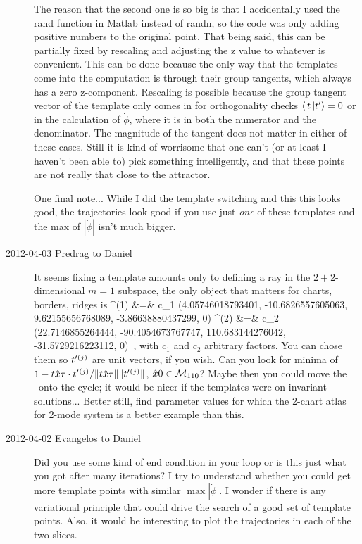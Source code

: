 \begin{description}
The reason that the second one is so big is that I accidentally used the
rand function in Matlab instead of randn, so the code was only adding
positive numbers to the original point. That being said, this can be
partially fixed by rescaling and adjusting the z value to whatever is
convenient. This can be done because the only way that the templates come
into the computation is through their group tangents, which always has a
zero z-component. Rescaling is possible because the group tangent vector
of the template only comes in for orthogonality checks
$\braket{\,t\,}{\sliceTan{}{}} = 0$ or in the calculation of
$\dot{\phi}$, where it is in both the numerator and the denominator. The
magnitude of the tangent does not matter in either of these cases. Still
it is kind of worrisome that one can't (or at least I haven't been able
to) pick something intelligently, and that these points are not really
that close to the attractor.

One final note... While I did the template switching and this this looks
good, the trajectories look good if you use just \emph{one} of these
templates and the max of $|\dot{\phi}|$ isn't much bigger.

\item[2012-04-03 Predrag to Daniel] It seems fixing a template amounts only to defining a ray in the
$2 + 2$-dimensional $m=1$ subspace, the only object that matters for charts, borders, ridges is
\bea
\sliceTan{}{}^{(1)} &=& c_1 (4.05746018793401, -10.6826557605063,  9.62155656768089, -3.86638880437299, 0)
    \continue
\sliceTan{}{}^{(2)} &=& c_2 (22.7146855264444, -90.4054673767747, 110.683144276042, -31.5729216223112, 0)
\,,
\label{DanielTmpls}
\eea
with $c_1$ and $c_2$ arbitrary factors. You can chose them so
$t'_{}{}^{(j)}$ are unit vectors, if you wish. Can you look for
minima of
$1-t{\hat{x}{\tau}} \cdot t'_{}{}^{(j)}
   / \|{t{\hat{x}{\tau}}}\| \|{t'_{}{}^{(j)}}\|$, $\hat{x}{0} \in {\cal M}_{110}$?
Maybe then you could move the \template\ onto the cycle; it would be
nicer if the templates were on invariant solutions... Better still, find
parameter values for which the 2-chart atlas for 2-mode system is a
better example than this.

\item[2012-04-02 Evangelos to Daniel] Did you use some kind of end condition in
your loop or is this just what you got after many iterations? I try to understand
whether you could get more template points with similar $\max |\dot{\phi}|$.
I wonder if there is any variational principle that could drive the search of
a good set of template points.
Also, it would be interesting to plot the trajectories in each of the two slices.


\end{description}
